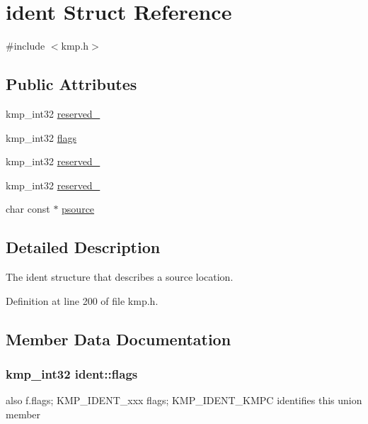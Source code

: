 \hypertarget{structident}{\section{ident Struct Reference}
\label{structident}
}


{\ttfamily \#include $<$kmp.\-h$>$}

\subsection*{Public Attributes}
\begin{DoxyCompactItemize}
\item 
kmp\-\_\-int32 \hyperlink{structident_a8a098c07080704af1d89e401a1b4d10f}{reserved\-\_}
\item 
kmp\-\_\-int32 \hyperlink{structident_afa1ec17df36c4bf1e36e97eab63953b9}{flags}
\item 
kmp\-\_\-int32 \hyperlink{structident_a91db2d18476e0a527ba20e04ca2c3e74}{reserved\-\_}
\item 
kmp\-\_\-int32 \hyperlink{structident_ae29e80f6fc150f73c1790c8796bcfd9f}{reserved\-\_}
\item 
char const $\ast$ \hyperlink{structident_a8c2ccc106967f36d7191d59d4d5a65dc}{psource}
\end{DoxyCompactItemize}


\subsection{Detailed Description}
The ident structure that describes a source location. 

Definition at line 200 of file kmp.\-h.



\subsection{Member Data Documentation}
\hypertarget{structident_afa1ec17df36c4bf1e36e97eab63953b9}{
\subsubsection[{flags}]{\setlength{\rightskip}{0pt plus 5cm}kmp\-\_\-int32 ident\-::flags}}\label{structident_afa1ec17df36c4bf1e36e97eab63953b9}
also f.\-flags; K\-M\-P\-\_\-\-I\-D\-E\-N\-T\-\_\-xxx flags; K\-M\-P\-\_\-\-I\-D\-E\-N\-T\-\_\-\-K\-M\-P\-C identifies this union member 

